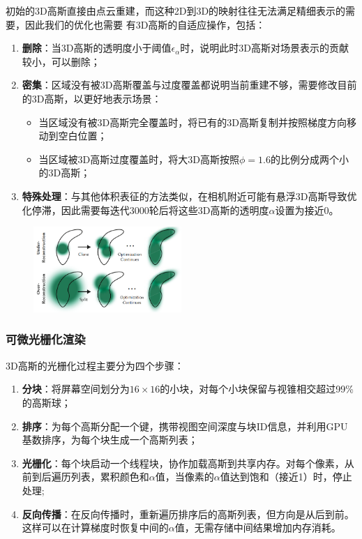 初始的3D高斯直接由点云重建，而这种2D到3D的映射往往无法满足精细表示的需要，因此我们的优化也需要
有3D高斯的自适应操作，包括：
\begin{enumerate}
    \item \textbf{删除}：当3D高斯的透明度小于阈值$\epsilon_{\alpha}$时，说明此时3D高斯对场景表示的贡献较小，可以删除；
    \item \textbf{密集}：区域没有被3D高斯覆盖与过度覆盖都说明当前重建不够，需要修改目前的3D高斯，以更好地表示场景：
        \begin{itemize}
            \item 当区域没有被3D高斯完全覆盖时，将已有的3D高斯复制并按照梯度方向移动到空白位置；
            \item 当区域被3D高斯过度覆盖时，将大3D高斯按照$\phi=1.6$的比例分成两个小的3D高斯；
        \end{itemize}
    \item \textbf{特殊处理}：与其他体积表征的方法类似，在相机附近可能有悬浮3D高斯导致优化停滞，因此需要每迭代3000轮后将这些3D高斯的透明度$\alpha$设置为接近0。
\end{enumerate}

\begin{figure}[ht]
    \centering
    \includegraphics[width=0.5\textwidth]{source/img/gauss_recon.png}
\end{figure}

\subsubsection{可微光栅化渲染}

3D高斯的光栅化过程主要分为四个步骤：
\begin{enumerate}
    \item \textbf{分块}：将屏幕空间划分为$16\times 16$的小块，对每个小块保留与视锥相交超过99\%的高斯球；
    \item \textbf{排序}：为每个高斯分配一个键，携带视图空间深度与块ID信息，并利用GPU基数排序，为每个块生成一个高斯列表；
    \item \textbf{光栅化}：每个块启动一个线程块，协作加载高斯到共享内存。对每个像素，从前到后遍历列表，累积颜色和$\alpha$值，当像素的$\alpha$值达到饱和（接近1）时，停止处理;
    \item \textbf{反向传播}：在反向传播时，重新遍历排序后的高斯列表，但方向是从后到前。这样可以在计算梯度时恢复中间的$\alpha$值，无需存储中间结果增加内存消耗。
\end{enumerate}

